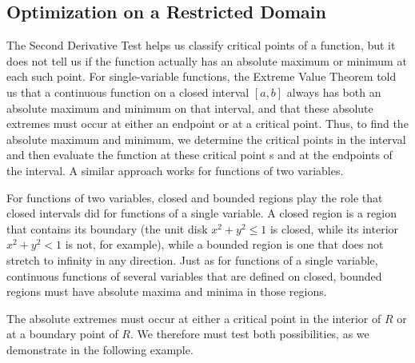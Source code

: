 




\subsection*{Optimization on a Restricted Domain}

The Second Derivative Test helps us classify critical points of a
function, but it does not tell us if the function actually has an
absolute maximum or minimum at each such point. For single-variable functions, the
Extreme Value Theorem told us that a continuous function on a
closed interval $[a, b]$ always has both an absolute maximum and minimum on
that interval, and that these absolute extremes must occur at either an endpoint or at a critical point. Thus, to find the absolute maximum and minimum, we determine the
critical points in the interval and then evaluate the function at these
critical point s and at the endpoints of the interval.  A similar approach works for functions of two variables.

For functions of two variables, closed and bounded regions play the
role that closed intervals did for functions of a single variable. A
closed region is a region that contains its boundary (the unit disk $x^2+y^2 \leq 1$ is closed, while its interior $x^2+y^2 < 1$ is not, for example), while a bounded region is
one that does not stretch to infinity in any direction. Just as for
functions of a single variable, continuous functions of several
variables that are defined on closed, bounded regions must have
absolute maxima and minima in those regions. 

\vspace*{5pt}
\nin {}
\vspace*{5pt}

The absolute extremes must occur at either a critical point in the interior of
$R$ or at a boundary point of $R$.  We
therefore must  test both possibilities, as we demonstrate in the following example.

